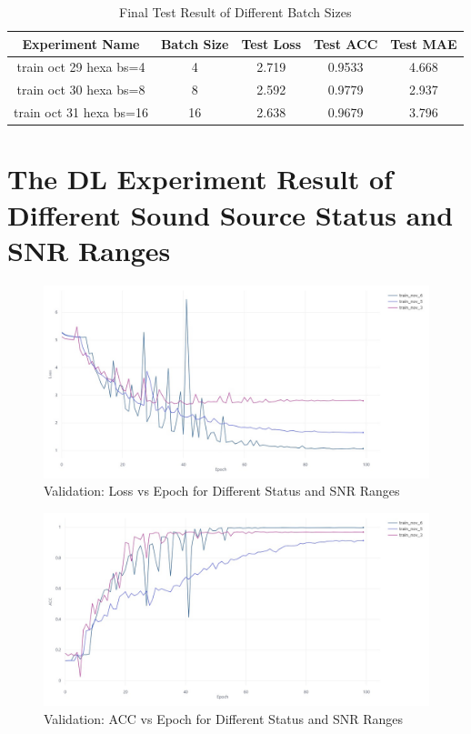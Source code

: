 \begin{table}[H]
    \centering
    \begin{tabular}{|c|c|c|c|c|}
        \hline
         Experiment Name& Batch Size & Test Loss & Test ACC & Test MAE\\
         \hline
         train oct 29 hexa bs=4& 4 & 2.719 & 0.9533 & 4.668\\
         \hline
         train oct 30 hexa bs=8& 8 & 2.592 & 0.9779 & 2.937\\
         \hline
         train oct 31 hexa bs=16& 16 & 2.638 & 0.9679 & 3.796\\
         \hline
    \end{tabular}
    \caption{Final Test Result of Different Batch Sizes}
\end{table}

\section*{The DL Experiment Result of Different Sound Source Status and SNR Ranges}
\begin{figure}[H]
    \centering
    \includegraphics[width=1\linewidth]{figures/StatusSNR Valid_ Loss VS epoch.jpeg}
    \caption{Validation: Loss vs Epoch for Different Status and SNR Ranges}
\end{figure}
\begin{figure}[H]
    \centering
    \includegraphics[width=1\linewidth]{figures/StatusSNR Valid_ ACC VS epoch.jpeg}
    \caption{Validation: ACC vs Epoch for Different Status and SNR Ranges}
\end{figure}
